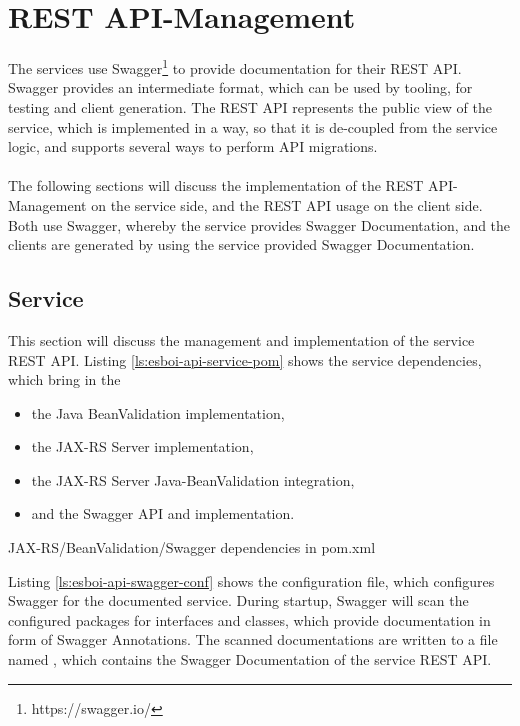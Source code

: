 \section{REST API-Management}
\label{sec:esbi-api}
The services use Swagger\footnote{https://swagger.io/} to provide documentation for their REST API. Swagger provides an intermediate format, which can be used by tooling, for testing and client generation. The REST API represents the public view of the service, which is implemented in a way, so that it is de-coupled from the service logic, and supports several ways to perform API migrations.
\\ \\
The following sections will discuss the implementation of the REST API-Management on the service side, and the REST API usage on the client side. Both use Swagger, whereby the service provides Swagger Documentation, and the clients are generated by using the service provided Swagger Documentation.

\subsection{Service}
\label{sec:esbi-api-service}
This section will discuss the management and implementation of the service REST API. Listing \vref{ls:esboi-api-service-pom} shows the service dependencies, which bring in the 
\begin{itemize}
	\item the Java BeanValidation implementation, 
	\item the JAX-RS Server implementation,
	\item the JAX-RS Server Java-BeanValidation integration,
	\item and the Swagger API and implementation. 
\end{itemize}

\begin{listing}[h]
	\caption{JAX-RS/BeanValidation/Swagger dependencies in pom.xml}
	\label{ls:esboi-api-service-pom}
\end{listing}

Listing \vref{ls:esboi-api-swagger-conf} shows the  configuration file, which configures Swagger for the documented service. During startup, Swagger will scan the configured packages for interfaces and classes, which provide documentation in form of Swagger Annotations. The scanned documentations are written to a file named , which contains the Swagger Documentation of the service REST API.    

